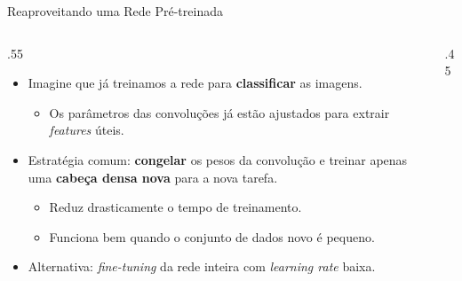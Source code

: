 \documentclass[aspectratio=169,xcolor=dvipsnames]{beamer}
\newcommand{\vstep}{14}
\newcommand{\vgpitch}{0.27}
\newcommand{\chipconv}[1]{conv $3{\times}3$, #1}
\newcommand{\chipfc}[1]{fc, #1}
\newcommand{\vggstack}[2]{%
    \foreach \i/\s/\txt/\col/\tcol in {
        0/0/entrada/black!55/white,
        1/1/\chipconv{64}/BrickRed!75/white,
        2/1/\chipconv{64}/BrickRed!75/white,
        3/2/pooling/PastelGreen/black,
        4/3/\chipconv{128}/BrickRed!75/white,
        5/3/\chipconv{128}/BrickRed!75/white,
        6/4/pooling/PastelGreen/black,
        7/5/\chipconv{256}/BrickRed!75/white,
        8/5/\chipconv{256}/BrickRed!75/white,
        9/5/\chipconv{256}/BrickRed!75/white,
        10/6/pooling/PastelGreen/black,
        11/7/\chipconv{512}/BrickRed!75/white,
        12/7/\chipconv{512}/BrickRed!75/white,
        13/7/\chipconv{512}/BrickRed!75/white,
        14/8/pooling/PastelGreen/black,
        15/9/\chipconv{512}/BrickRed!75/white,
        16/9/\chipconv{512}/BrickRed!75/white,
        17/9/\chipconv{512}/BrickRed!75/white,
        18/10/pooling/PastelGreen/black,
        19/11/\chipfc{4096}/PastelBlue2!80/white,
        20/11/\chipfc{4096}/PastelBlue2!80/white,
        21/12/\chipfc{1000}/PastelBlue2!80/white,
        22/13/softmax/Goldenrod!70/black}{
        \node[vgchipbase, vgchip={\s}{\col}{\tcol}] at (#1, #2 + \i*\vgpitch) {\txt};
    }%
}
\newcommand{\vgtransferstack}[3]{%
    \foreach \i/\p/\txt/\col/\tcol in {
        0/0/entrada/black!55/white,
        1/1/\chipconv{64}/BrickRed!75/white,
        2/1/\chipconv{64}/BrickRed!75/white,
        3/1/pooling/PastelGreen/black,
        4/1/\chipconv{128}/BrickRed!75/white,
        5/1/\chipconv{128}/BrickRed!75/white,
        6/1/pooling/PastelGreen/black,
        7/1/\chipconv{256}/BrickRed!75/white,
        8/1/\chipconv{256}/BrickRed!75/white,
        9/1/\chipconv{256}/BrickRed!75/white,
        10/1/pooling/PastelGreen/black,
        11/1/\chipconv{512}/BrickRed!75/white,
        12/1/\chipconv{512}/BrickRed!75/white,
        13/1/\chipconv{512}/BrickRed!75/white,
        14/1/pooling/PastelGreen/black,
        15/1/\chipconv{512}/BrickRed!75/white,
        16/1/\chipconv{512}/BrickRed!75/white,
        17/1/\chipconv{512}/BrickRed!75/white,
        18/1/pooling/PastelGreen/black,
        19/2/\chipfc{4096}/PastelBlue2!80/white,
        20/2/\chipfc{4096}/PastelBlue2!80/white,
        21/2/\chipfc{4}/PastelBlue2!80/white,
        22/2/sigmoide/Goldenrod!70/black}{
        \node[vgchipbase, fill=\col, text=\tcol, vgtchip={\p}{#3}] at (#1, #2 + \i*\vgpitch) {\txt};
    }%
}
\begin{document}
\begin{frame}{Reaproveitando uma Rede Pré-treinada}
\begin{columns}[T]
    \begin{column}{.55\linewidth}
        \begin{itemize}
            \item<1-> Imagine que já treinamos a rede para \textbf{classificar} as imagens.
            \begin{itemize}
                \item Os parâmetros das convoluções já estão ajustados para extrair \textit{features} úteis.
            \end{itemize}
            \item<2-> Estratégia comum: \textbf{congelar} os pesos da convolução e treinar apenas uma \textbf{cabeça densa nova} para a nova tarefa.
            \begin{itemize}
                \item Reduz drasticamente o tempo de treinamento.
                \item Funciona bem quando o conjunto de dados novo é pequeno.
            \end{itemize}
            \item<3-> Alternativa: \textit{fine-tuning} da rede inteira com \textit{learning rate} baixa.
        \end{itemize}
    \end{column}
    \begin{column}{.45\linewidth}
        \centering
        \renewcommand{\vgpitch}{0.245}%
\end{column}
\end{columns}
\end{frame}
\end{document}
